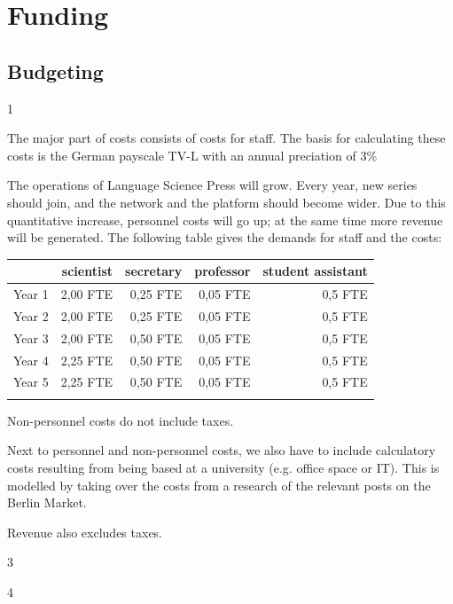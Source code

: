\documentclass[output=guidelines,nonflat,
draftmode
]{langsci/langscibook}
\newcommand{\background}[1]{ 
  \vspace{5mm}
  \renewcommand{\tblslinecolour}{lsDarkBlue}
  \tblssy[red]{explore2}{Background}{#1}
}
\newcommand{\langscisolution}[1]{
  \renewcommand{\tblslinecolour}{lsLightBlue}
  \tblssy{langsci}{LangSci solution}{#1}
}
\newcommand{\evaluation}[1]{
  \renewcommand{\tblslinecolour}{lsLightOrange}
  \tblssy{receipt}{Evaluation}{#1}
}
\newcommand{\othersolutions}[1]{
  \renewcommand{\tblslinecolour}{lsDarkGreenOne}
  \tblssy{more}{Other solutions}{#1}
}
\renewcommand{\tblssy}[4][black!12]{%
  \renewcommand{\langscisymbol}{#2}\renewcommand{\tblsboxcolor}{#1}
  \begin{mdframed}[style=yellowexercise,frametitle={#3}]
    #4
  \end{mdframed}
}
\begin{document}
\chapter{Funding}

\section{Budgeting}

\background{1}
\langscisolution{
The major part of costs consists of costs for staff. The basis for calculating these costs is the German payscale TV-L with an annual preciation of 3\%

The operations of Language Science Press will grow. Every year, new series should join, and the network and the platform should become wider. Due to this quantitative increase, personnel costs will go up; at the same time more revenue will be generated. The following table gives the demands for staff and the costs: 

\noindent
\begin{tabularx}{\textwidth}{Xrrrr}
\lsptoprule
         &  scientist  & secretary &   professor &   student assistant  \\
\midrule
Year 1 &  2,00 FTE                 &    0,25 FTE                       &   0,05 FTE    &   0,5 FTE                  \\
Year 2 &  2,00 FTE                 &    0,25 FTE                       &   0,05 FTE    &   0,5 FTE                  \\
Year 3 &  2,00 FTE                 &    0,50 FTE                        &   0,05 FTE    &   0,5 FTE                  \\
Year 4 &  2,25 FTE              &    0,50 FTE                        &   0,05 FTE    &   0,5 FTE                  \\
Year 5 &  2,25 FTE              &    0,50 FTE                        &   0,05 FTE    &   0,5 FTE                  \\
\lspbottomrule
\end{tabularx}

Non-personnel costs do not include taxes. 

Next to personnel and non-personnel costs, we also have to include calculatory costs resulting from being based at a university (e.g. office space or IT). This is modelled by taking over the costs from a research of the relevant posts on the Berlin Market. 

Revenue also excludes taxes. 
}
\evaluation{3}
\othersolutions{4}
  
\end{document}

